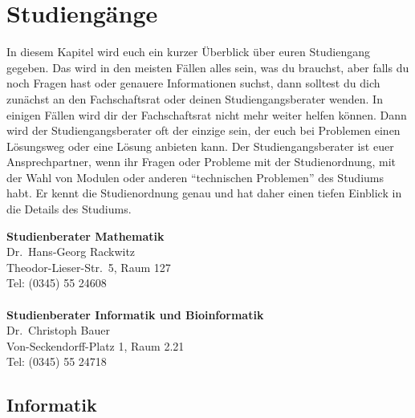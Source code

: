 
\section{Studiengänge}

In diesem Kapitel wird euch ein kurzer Überblick über euren Studiengang gegeben.
Das wird in den meisten Fällen alles sein, was du brauchst, aber falls du noch Fragen hast oder genauere Informationen suchst, dann solltest du dich zunächst an den Fachschaftsrat oder deinen Studiengangsberater wenden.
In einigen Fällen wird dir der Fachschaftsrat nicht mehr weiter helfen können.
Dann wird der Studiengangsberater oft der einzige sein, der euch bei Problemen einen Lösungsweg oder eine Lösung anbieten kann.
Der Studiengangsberater ist euer Ansprechpartner, wenn ihr Fragen oder Probleme
mit der Studienordnung, mit der Wahl von Modulen oder anderen \enquote{technischen Problemen} des Studiums habt.
Er kennt die Studienordnung genau und hat daher einen tiefen Einblick in die Details des Studiums.

\textbf{Studienberater Mathematik}\\
Dr.\ Hans-Georg Rackwitz\\
Theodor-Lieser-Str.\ 5, Raum 127\\
Tel: (0345) 55 24608\\
\\

\textbf{Studienberater Informatik und Bioinformatik}\\
Dr.\ Christoph Bauer\\
Von-Seckendorff-Platz 1, Raum 2.21\\
Tel: (0345) 55 24718\\



\subsection{Informatik}
\label{studiengang_informatik}
    
